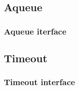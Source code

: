 \subsection{Aqueue}

\subsubsection{Aqueue iterface}

\subsection{Timeout}

\subsubsection{Timeout interface}



\begin{lstlisting}

\end{lstlisting}

